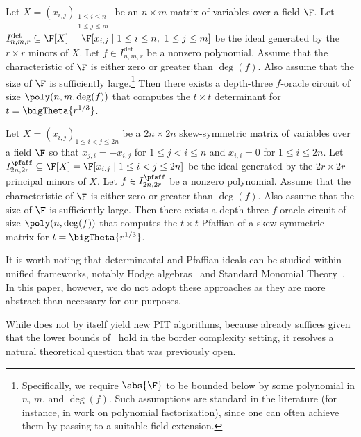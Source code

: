 \documentclass[letterpaper, 11pt]{amsart}
\begin{document}
\begin{thrm}\label{thrm:main}
Let $X = (x_{i,j})_{\substack{1 \leq i \leq n \\ 1 \leq j \leq m}}$ be an $n \times m$ matrix of variables over a field $\F$.
Let $I^{\det}_{n,m,r} \subseteq \F[X] = \F[x_{i,j} \mid 1 \leq i \leq n,\ 1 \leq j \leq m]$ be the ideal generated by the $r \times r$ minors of $X$.  
Let $f \in I^{\det}_{n,m,r}$ be a nonzero polynomial.  
Assume that the characteristic of $\F$ is either zero or greater than $\deg(f)$.
Also assume that the size of $\F$ is sufficiently large.\footnote{Specifically, we require $\abs{\F}$ to be bounded below by some polynomial in $n$, $m$, and $\deg(f)$.
Such assumptions are standard in the literature (for instance, in work on polynomial factorization), since one can often achieve them by passing to a suitable field extension.} 
Then there exists a depth-three $f$-oracle circuit of size $\poly(n, m, \deg(f))$ that computes the $t \times t$ determinant for $t = \bigTheta{r^{1/3}}$.
\end{thrm}

\begin{thrm}\label{thrm:pfaff_main}
Let $X = (x_{i,j})_{1 \leq i < j \leq 2n}$ be a $2n \times 2n$ skew-symmetric matrix of variables over a field $\F$ so that $x_{j, i} = -x_{i, j}$ for $1 \leq j < i \leq n$ and $x_{i, i} = 0$ for $1 \leq i \leq 2n$.
Let $I^{\pfaff}_{2n, 2r} \subseteq \F[X] = \F[x_{i,j} \mid 1 \leq i < j \leq 2n]$ be the ideal generated by the $2r \times 2r$ principal minors of $X$.  
Let $f \in I^{\pfaff}_{2n, 2r}$ be a nonzero polynomial.  
Assume that the characteristic of $\F$ is either zero or greater than $\deg(f)$.
Also assume that the size of $\F$ is sufficiently large. 
Then there exists a depth-three $f$-oracle circuit of size $\poly(n, \deg(f))$ that computes the $t \times t$ Pfaffian of a skew-symmetric matrix for $t = \bigTheta{r^{1/3}}$.
\end{thrm}

It is worth noting that determinantal and Pfaffian ideals can be studied within unified frameworks, notably Hodge algebras~\cite{DEP82} and Standard Monomial Theory~\cite{LR08,Ses16}.
In this paper, however, we do not adopt these approaches as they are more abstract than necessary for our purposes.

While  does not by itself yield new PIT algorithms, because  already suffices given that the lower bounds of~\cite{LST25} hold in the border complexity setting, it resolves a natural theoretical question that was previously open. 
\end{document}
